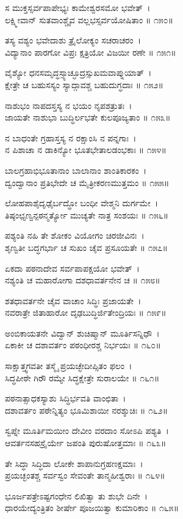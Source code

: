 ಸ ಮುಕ್ತಸ್ಸರ್ವಪಾಪೇಭ್ಯಃ ಕಾಮೇಶ್ವರಸಮೋ ಭವೇತ್~।\\
ಲಕ್ಷ್ಮೀವಾನ್ ಸುತವಾಂಶ್ಚೈವ ವಲ್ಲಭಸ್ಸರ್ವಯೋಷಿತಾಂ ॥ ೧೫೦॥

ತಸ್ಯ ವಶ್ಯಂ ಭವೇದಾಶು ತ್ರೈಲೋಕ್ಯಂ ಸಚರಾಚರಂ~।\\
ವಿದ್ಯಾನಾಂ ಪಾರಗೋ ವಿಪ್ರಃ ಕ್ಷತ್ರಿಯೋ ವಿಜಯೀ ರಣೇ ॥ ೧೫೧॥

ವೈಶ್ಯೋ ಧನಸಮೃದ್ಧಸ್ಸ್ಯಾಚ್ಛೂದ್ರಸ್ಸುಖಮವಾಪ್ನುಯಾತ್~।\\
ಕ್ಷೇತ್ರೇ ಚ ಬಹುಸಸ್ಯಂ ಸ್ಯಾದ್ಗಾವಶ್ಚ ಬಹುದುಗ್ಧದಾಃ ॥ ೧೫೨॥

ನಾಶುಭಂ ನಾಪದಸ್ತಸ್ಯ ನ ಭಯಂ ನೃಪಶತ್ರುತಃ~।\\
ಜಾಯತೇ ನಾಶುಭಾ ಬುದ್ಧಿರ್ಲಭತೇ ಕುಲಪೂಜ್ಯತಾಂ ॥ ೧೫೩॥

ನ ಬಾಧಂತೇ ಗ್ರಹಾಸ್ತಸ್ಯ ನ ರಕ್ಷಾಂಸಿ ನ ಪನ್ನಗಾಃ~।\\
ನ ಪಿಶಾಚಾ ನ ಡಾಕಿನ್ಯೋ ಭೂತಭೇತಾಲಡಂಭಕಾಃ ॥ ೧೫೪॥

ಬಾಲಗ್ರಹಾಭಿಭೂತಾನಾಂ ಬಾಲಾನಾಂ ಶಾಂತಿಕಾರಕಂ~।\\
ದ್ವಂದ್ವಾನಾಂ ಪ್ರತಿಭೇದೇ ಚ ಮೈತ್ರೀಕರಣಮುತ್ತಮಂ ॥ ೧೫೫॥

ಲೋಹಪಾಶೈದೃಢೈರ್ಬದ್ಧೋ ಬಂಧೀ ವೇಶ್ಮನಿ ದುರ್ಗಮೇ~।\\
ತಿಷ್ಠಂಛೃಣ್ವನ್ಪಠನ್ಮರ್ತ್ಯೋ ಮುಚ್ಯತೇ ನಾತ್ರ ಸಂಶಯಃ ॥ ೧೫೬॥

ಪಶ್ಯಂತಿ ನಹಿ ತೇ ಶೋಕಂ ವಿಯೋಗಂ ಚಿರಜೀವಿನಃ~।\\
ಶೃಣ್ವತೀ ಬದ್ಧಗರ್ಭಾ ಚ ಸುಖಂ ಚೈವ ಪ್ರಸೂಯತೇ ॥ ೧೫೭॥

ಏಕದಾ ಪಠನಾದೇವ ಸರ್ವಪಾಪಕ್ಷಯೋ ಭವೇತ್~।\\
ನಶ್ಯಂತಿ ಚ ಮಹಾರೋಗಾ ದಶಧಾವರ್ತನೇನ ಚ ॥ ೧೫೮॥

ಶತಧಾವರ್ತನೇ ಚೈವ ವಾಚಾಂ ಸಿದ್ಧಿಃ ಪ್ರಜಾಯತೇ~।\\
ನವರಾತ್ರೇ ಜಿತಾಹಾರೋ ದೃಢಬುದ್ಧಿರ್ಜಿತೇಂದ್ರಿಯಃ ॥ ೧೫೯॥

ಅಂಬಿಕಾಯತನೇ ವಿದ್ವಾನ್ ಶುಚಿಷ್ಮಾನ್ ಮೂರ್ತಿಸನ್ನಿಧೌ~।\\
ಏಕಾಕೀ ಚ ದಶಾವರ್ತಂ ಪಠಂಧೀರಶ್ಚ ನಿರ್ಭಯಃ ॥ ೧೬೦॥

ಸಾಕ್ಷಾತ್ತ್ವಗವತೀ ತಸ್ಮೈ ಪ್ರಯಚ್ಛೇದೀಪ್ಸಿತಂ ಫಲಂ~।\\
ಸಿದ್ಧಪೀಠೇ ಗಿರೌ ರಮ್ಯೇ ಸಿದ್ಧಕ್ಷೇತ್ರೇ ಸುರಾಲಯೇ ॥ ೧೬೧॥

ಪಠನಾತ್ಸಾಧಕಸ್ಯಾಶು ಸಿದ್ಧಿರ್ಭವತಿ ವಾಂಛಿತಾ~।\\
ದಶಾವರ್ತಂ ಪಠೇನ್ನಿತ್ಯಂ ಭೂಮಿಶಾಯೀ ನರಶ್ಶುಚಿಃ ॥ ೧೬೨॥

ಸ್ವಪ್ನೇ ಮೂರ್ತಿಮಯೀಂ ದೇವೀಂ ವರದಾಂ ಸೋಽಪಿ ಪಶ್ಯತಿ~।\\
ಆವರ್ತನಸಹಸ್ರೈರ್ಯೇ ಜಪಂತಿ ಪುರುಷೋತ್ತಮಾಃ ॥ ೧೬೩॥

ತೇ ಸಿದ್ಧಾ ಸಿದ್ಧಿದಾ ಲೋಕೇ ಶಾಪಾನುಗ್ರಹಣಕ್ಷಮಾಃ~।\\
ಪ್ರಯಚ್ಛಂತಶ್ಚ ಸರ್ವಸ್ವಂ ಸೇವಂತೇ ತಾನ್ಮಹೀಶ್ವರಾಃ ॥ ೧೬೪॥

ಭೂರ್ಜಪತ್ರೇಽಷ್ಟಗಂಧೇನ ಲಿಖಿತ್ವಾ ತು ಶುಭೇ ದಿನೇ~।\\
ಧಾರಯೇದ್ಯಂತ್ರಿತಂ ಶೀರ್ಷೇ ಪೂಜಯಿತ್ವಾ ಕುಮಾರಿಕಾಂ ॥ ೧೬೫॥

